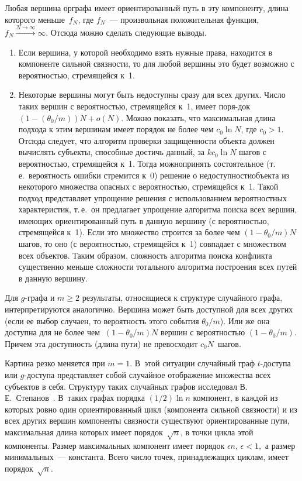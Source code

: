 \begin{multicols}{2}
Любая вершина орграфа имеет ориентированный путь в эту компоненту,
длина которого меньше~$f_N$, где $f_N$~--- произвольная положительная
функция, $f_N\overset {N\rightarrow \infty}{\longrightarrow} \infty$. Отсюда
можно сделать следующие выводы.
\begin{enumerate}
    \item Если вершина, у которой необходимо взять нужные права, находится в компоненте 
    сильной связности, то для любой вершины это будет возможно с вероятностью, стремящейся к~1.
    \item Некоторые вершины могут быть недоступны сразу для всех других. Число таких вершин с 
    вероятностью, стремящейся к~1, имеет поря-\linebreak док~ $(1-(\theta_0/m))N +o(N)$. Можно показать, что 
    максимальная длина подхода к этим вершинам имеет порядок не более чем $c_0\ln{N}$, где $c_0>1$. 
    Отсюда следует, что алгоритм проверки защищенности объекта должен вычислять субъекты, способные 
    достичь данный, за $k c_0\ln{N}$ шагов с вероятностью, стремящейся к~1. Тогда можно\linebreak принять состоятельное 
    (т.\,е.\ вероятность ошибки стремится к~0) решение о недоступности\linebreak объекта из некоторого множества 
    опасных с вероятностью, стремящейся к~1. Такой подход представляет упрощение решения с использованием 
    вероятностных характеристик, т.\,е.\ он предлагает упрощение алгоритма поиска всех вершин, имеющих 
    ориентированный путь в данную вершину (с вероятностью, стремящейся к~1). Если это множество строится 
    за более чем $(1-\theta_0/m)N$ шагов, то оно (с ве\-ро\-ят\-ностью, стремящейся к~1) совпадает с множеством всех объектов. 
    Таким образом, сложность алгоритма поиска конфликта существенно меньше сложности тотального алгоритма построения всех 
    путей в данную вершину.
\end{enumerate}

Для $g$-графа и $m\geq 2$ результаты, относящиеся к структуре
случайного графа, интерпретируются аналогично. Вершина может быть
доступной для всех других (если ее выбор случаен, то вероятность
этого события ${\theta_0}/{m}$). Или же она доступна для не
более чем $~ (1-{\theta_0}/{m})N$ вершин с вероятностью 
$(1-{\theta_0}/{m})$. Причем эта доступность (длина пути) не
превосходит $c_0N$~шагов.

Картина резко меняется при $m=1$. В~этой ситуации случайный граф
$t$-до\-сту\-па или $g$-до\-сту\-па представляет собой случайное отображение
множества всех субъектов в себя. Структуру таких случайных графов
исследовал В.\,Е.~Степанов~\cite{b3}. В~таких графах порядка
$({1}/{2})\ln{n}$ компонент, в каждой из которых ровно один
ориентированный цикл (компонента сильной связности) и из всех других
вершин компоненты связности существуют ориентированные пути,
максимальная длина которых имеет порядок~$\sqrt{n}$, в точки цикла
этой компоненты. Размер максимальных компонент имеет порядок
$\epsilon n$, $\epsilon < 1,$ а размер минимальных~--- константа. Всего
число точек, принадлежащих циклам, имеет порядок~$\sqrt{n}$.


\end{multicols}
